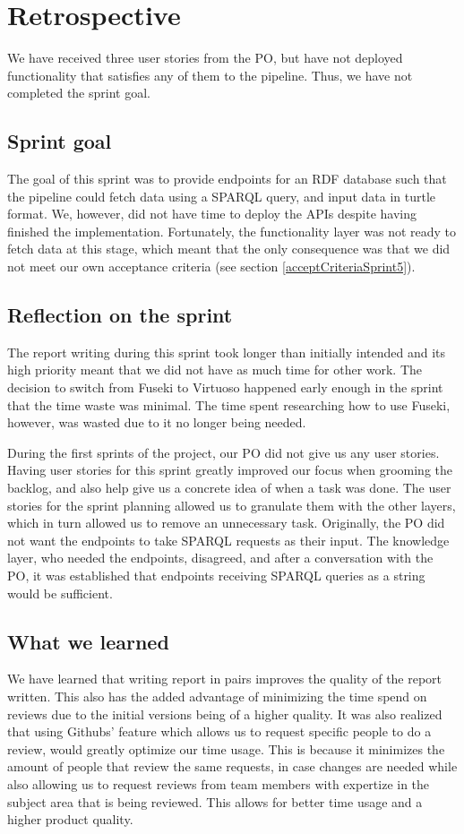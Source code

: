 \section{Retrospective}
We have received three user stories from the PO, but have not deployed functionality that satisfies any of them to the \knox{} pipeline. Thus, we have not completed the sprint goal.

\subsection{Sprint goal}
The goal of this sprint was to provide endpoints for an RDF database such that the \knox{} pipeline could fetch data using a SPARQL query, and input data in turtle format. We, however, did not have time to deploy the APIs despite having finished the implementation. Fortunately, the functionality layer was not ready to fetch data at this stage, which meant that the only consequence was that we did not meet our own acceptance criteria (see section \ref{acceptCriteriaSprint5}).

\subsection{Reflection on the sprint}
The report writing during this sprint took longer than initially intended and its high priority meant that we did not have as much time for other work.
The decision to switch from Fuseki to Virtuoso happened early enough in the sprint that the time waste was minimal. The time spent researching how to use Fuseki, however, was wasted due to it no longer being needed.

During the first sprints of the project, our PO did not give us any user stories. Having user stories for this sprint greatly improved our focus when grooming the backlog, and also help give us a concrete idea of when a task was done. 
The user stories for the sprint planning allowed us to granulate them with the other layers, which in turn allowed us to remove an unnecessary task. Originally, the PO did not want the endpoints to take SPARQL requests as their input.
The knowledge layer, who needed the endpoints, disagreed, and after a conversation with the PO, it was established that endpoints receiving SPARQL queries as a string would be sufficient.

\subsection{What we learned}
We have learned that writing report in pairs improves the quality of the report written. This also has the added advantage of minimizing the time spend on reviews due to the initial versions being of a higher quality.
It was also realized that using Githubs' feature which allows us to request specific people to do a review, would greatly optimize our time usage. This is because it minimizes the amount of people that review the same requests, in case changes are needed while also allowing us to request reviews from team members with expertize in the subject area that is being reviewed. This allows for better time usage and a higher product quality. 

